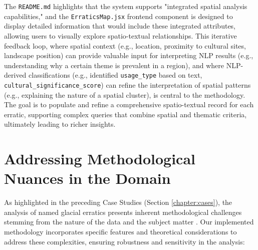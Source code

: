 \documentclass[
11pt, %
english, %
singlespacing, %
headsepline, %
]{MastersDoctoralThesis} %
\begin{document}
The \texttt{README.md} highlights that the system supports "integrated spatial analysis capabilities," and the \texttt{ErraticsMap.jsx} frontend component is designed to display detailed information that would include these integrated attributes, allowing users to visually explore spatio-textual relationships. This iterative feedback loop, where spatial context (e.g., location, proximity to cultural sites, landscape position) can provide valuable input for interpreting NLP results (e.g., understanding why a certain theme is prevalent in a region), and where NLP-derived classifications (e.g., identified \texttt{usage\_type} based on text, \texttt{cultural\_significance\_score}) can refine the interpretation of spatial patterns (e.g., explaining the nature of a spatial cluster), is central to the methodology. The goal is to populate and refine a comprehensive spatio-textual record for each erratic, supporting complex queries that combine spatial and thematic criteria, ultimately leading to richer insights.

\section{Addressing Methodological Nuances in the Domain}
\label{sec:addressing_nuances}

As highlighted in the preceding Case Studies (Section \ref{chapter:cases}), the analysis of named glacial erratics presents inherent methodological challenges stemming from the nature of the data and the subject matter \cite{Gregory2013}. Our implemented methodology incorporates specific features and theoretical considerations to address these complexities, ensuring robustness and sensitivity in the analysis:
\end{document}
